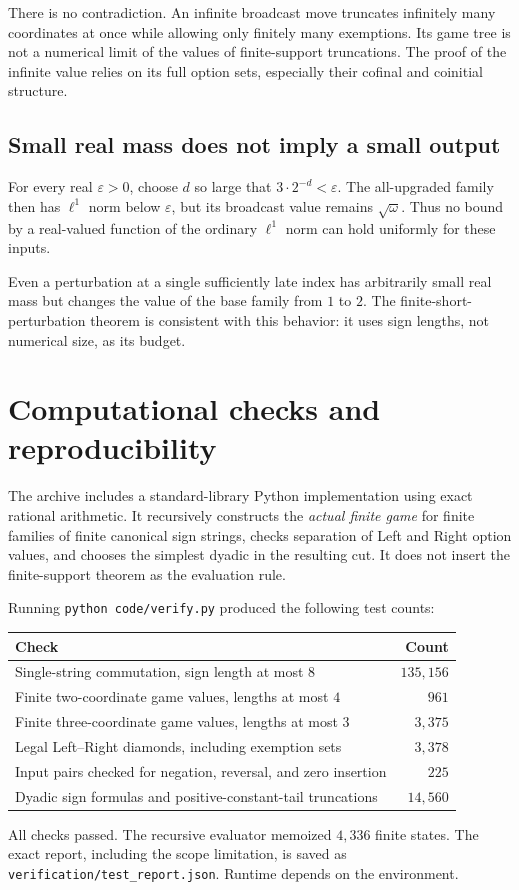 \documentclass[11pt,letterpaper]{article}
\theoremstyle{definition}
\theoremstyle{remark}
\begin{document}
There is no contradiction. An infinite broadcast move truncates infinitely many
coordinates at once while allowing only finitely many exemptions. Its game tree
is not a numerical limit of the values of finite-support truncations. The
proof of the infinite value relies on its full option sets, especially their
cofinal and coinitial structure.

\subsection{Small real mass does not imply a small output}

For every real $\varepsilon>0$, choose $d$ so large that $3\cdot2^{-d}<\varepsilon$.
The all-upgraded family then has $\ell^1$ norm below $\varepsilon$, but its
broadcast value remains $\sqrt{\omega}$. Thus no bound by a real-valued function
of the ordinary $\ell^1$ norm can hold uniformly for these inputs.

Even a perturbation at a single sufficiently late index has arbitrarily small
real mass but changes the value of the base family from $1$ to $2$.
The finite-short-perturbation theorem is consistent with this behavior: it uses
sign lengths, not numerical size, as its budget.

\section{Computational checks and reproducibility}\label{sec:verification}

The archive includes a standard-library Python implementation using exact
rational arithmetic. It recursively constructs the \emph{actual finite game}
for finite families of finite canonical sign strings, checks separation of
Left and Right option values, and chooses the simplest dyadic in the resulting
cut. It does not insert the finite-support theorem as the evaluation rule.

Running \texttt{python code/verify.py} produced the following test counts:
\begin{center}
\renewcommand{\arraystretch}{1.15}
\begin{tabular}{p{}r}
\toprule
Check & Count\\
\midrule
Single-string commutation, sign length at most $8$ & $135{,}156$\\
Finite two-coordinate game values, lengths at most $4$ & $961$\\
Finite three-coordinate game values, lengths at most $3$ & $3{,}375$\\
Legal Left--Right diamonds, including exemption sets & $3{,}378$\\
Input pairs checked for negation, reversal, and zero insertion & $225$\\
Dyadic sign formulas and positive-constant-tail truncations & $14{,}560$\\
\bottomrule
\end{tabular}
\end{center}
All checks passed. The recursive evaluator memoized $4{,}336$ finite states.
The exact report, including the scope limitation, is saved as
\texttt{verification/test\_report.json}. Runtime depends on the environment.
\end{document}
